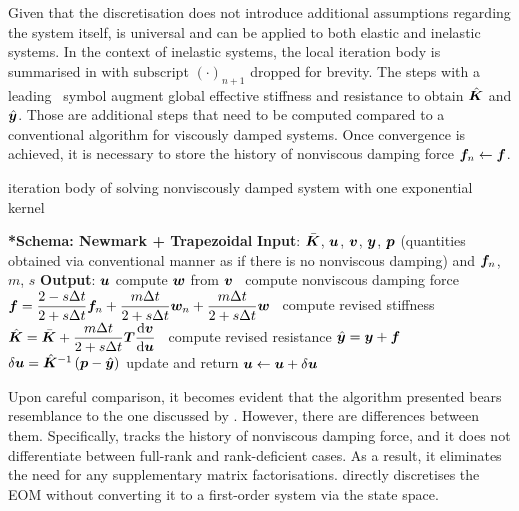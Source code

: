 Given that the discretisation  does not introduce additional assumptions regarding the system itself,  is universal and can be applied to both elastic and inelastic systems. In the context of inelastic systems, the local iteration body is summarised in  with subscript $\left(\cdot\right)_{n+1}$ dropped for brevity.
The steps with a leading \faMicrochip~symbol augment global effective stiffness and resistance to obtain $\hat{\bm{K}}$ and $\hat{\bm{y}}$. Those are additional steps that need to be computed compared to a conventional algorithm for viscously damped systems. Once convergence is achieved, it is necessary to store the history of nonviscous damping force $\bm{f}_n\leftarrow\bm{f}$.
\begin{breakablealgorithm}
\caption{iteration body of solving nonviscously damped system with one exponential kernel}\label{algo:single_model}
\begin{algorithmic}
\State \textbf{*Schema: Newmark + Trapezoidal}
\State \textbf{Input}: $\bar{\bm{K}}$, $\bm{u}$, $\bm{v}$, $\bm{y}$, $\bm{p}$ (quantities obtained via conventional manner as if there is no nonviscous damping) and $\bm{f}_n$, $m$, $s$
\State \textbf{Output}: $\bm{u}$
\State compute $\bm{w}$ from $\bm{v}$
\State \faMicrochip~compute nonviscous damping force $\bm{f}=\dfrac{2-s\Delta{}t}{2+s\Delta{}t}\bm{f}_n+\dfrac{m\Delta{}t}{2+s\Delta{}t}\bm{w}_n+\dfrac{m\Delta{}t}{2+s\Delta{}t}\bm{w}$
\State \faMicrochip~compute revised stiffness $\hat{\bm{K}}=\bar{\bm{K}}+\dfrac{m\Delta{}t}{2+s\Delta{}t}\bm{T}\dfrac{\mathrm{d}\bm{v}}{\mathrm{d}\bm{u}}$
\State \faMicrochip~compute revised resistance $\hat{\bm{y}}=\bm{y}+\bm{f}$
\State $\delta\bm{u}=\hat{\bm{K}}^{-1}\left(\bm{p}-\hat{\bm{y}}\right)$
\State update and return $\bm{u}\leftarrow\bm{u}+\delta\bm{u}$
\end{algorithmic}
\end{breakablealgorithm}

Upon careful comparison, it becomes evident that the algorithm presented bears resemblance to the one discussed by \citet{Adhikari2004}. However, there are differences between them. Specifically,  tracks the history of nonviscous damping force, and it does not differentiate between full-rank and rank-deficient cases. As a result, it eliminates the need for any supplementary matrix factorisations.  directly discretises the EOM  without converting it to a first-order system via the state space.

